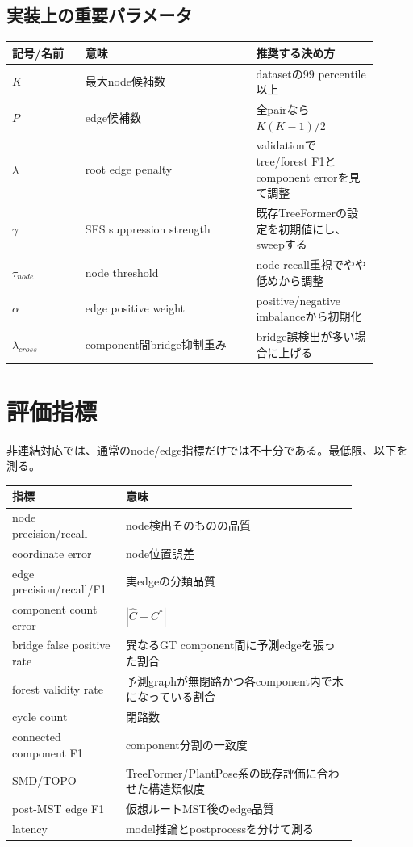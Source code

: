 \documentclass[11pt,a4paper]{article}
\begin{document}
\subsection{実装上の重要パラメータ}
\begin{longtable}{p{0.18\linewidth}p{0.42\linewidth}p{0.30\linewidth}}
\toprule
記号/名前 & 意味 & 推奨する決め方 \\
\midrule
$K$ & 最大node候補数 & datasetの99 percentile以上 \\
$P$ & edge候補数 & 全pairなら$K(K-1)/2$ \\
$\lambda$ & root edge penalty & validationでtree/forest F1とcomponent errorを見て調整 \\
$\gamma$ & SFS suppression strength & 既存TreeFormerの設定を初期値にし、sweepする \\
$\tau_{node}$ & node threshold & node recall重視でやや低めから調整 \\
$\alpha$ & edge positive weight & positive/negative imbalanceから初期化 \\
$\lambda_{cross}$ & component間bridge抑制重み & bridge誤検出が多い場合に上げる \\
\bottomrule
\end{longtable}

\section{評価指標}
非連結対応では、通常のnode/edge指標だけでは不十分である。最低限、以下を測る。

\begin{longtable}{p{0.24\linewidth}p{0.61\linewidth}}
\toprule
指標 & 意味 \\
\midrule
node precision/recall & node検出そのものの品質 \\
coordinate error & node位置誤差 \\
edge precision/recall/F1 & 実edgeの分類品質 \\
component count error & $|\hat{C}-C^*|$ \\
bridge false positive rate & 異なるGT component間に予測edgeを張った割合 \\
forest validity rate & 予測graphが無閉路かつ各component内で木になっている割合 \\
cycle count & 閉路数 \\
connected component F1 & component分割の一致度 \\
SMD/TOPO & TreeFormer/PlantPose系の既存評価に合わせた構造類似度 \\
post-MST edge F1 & 仮想ルートMST後のedge品質 \\
latency & model推論とpostprocessを分けて測る \\
\bottomrule
\end{longtable}
\end{document}
